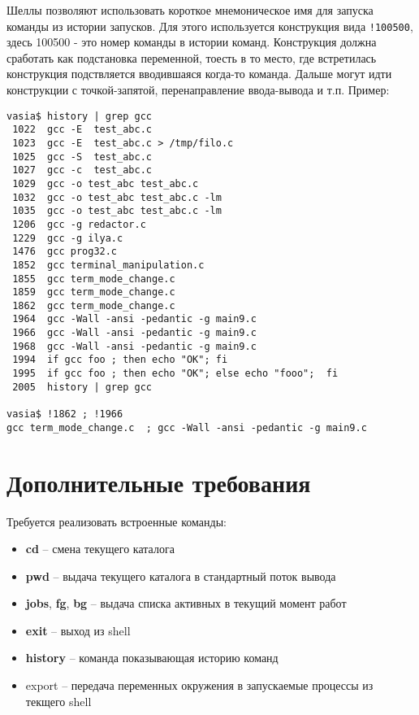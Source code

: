\documentclass[11pt, a4paper]{article}
\begin{document}
Шеллы позволяют использовать короткое мнемоническое имя для запуска команды из истории запусков.
Для этого используется конструкция вида \verb#!100500#, здесь 100500 - это номер команды в истории команд. 
Конструкция должна сработать как подстановка переменной, тоесть в то место, где встретилась конструкция подствляется 
вводившаяся когда-то команда. Дальше могут идти конструкции с точкой-запятой, перенаправление ввода-вывода
и т.п. Пример:
\begin{verbatim}
vasia$ history | grep gcc 
 1022  gcc -E  test_abc.c
 1023  gcc -E  test_abc.c > /tmp/filo.c
 1025  gcc -S  test_abc.c
 1027  gcc -c  test_abc.c
 1029  gcc -o test_abc test_abc.c
 1032  gcc -o test_abc test_abc.c -lm
 1035  gcc -o test_abc test_abc.c -lm
 1206  gcc -g redactor.c
 1229  gcc -g ilya.c 
 1476  gcc prog32.c 
 1852  gcc terminal_manipulation.c 
 1855  gcc term_mode_change.c 
 1859  gcc term_mode_change.c 
 1862  gcc term_mode_change.c 
 1964  gcc -Wall -ansi -pedantic -g main9.c 
 1966  gcc -Wall -ansi -pedantic -g main9.c 
 1968  gcc -Wall -ansi -pedantic -g main9.c 
 1994  if gcc foo ; then echo "OK"; fi
 1995  if gcc foo ; then echo "OK"; else echo "fooo";  fi
 2005  history | grep gcc

vasia$ !1862 ; !1966 
gcc term_mode_change.c  ; gcc -Wall -ansi -pedantic -g main9.c  
\end{verbatim}

\section{Дополнительные требования}

Требуется реализовать встроенные команды:
\begin{itemize}
\item  \textbf{cd} -- смена текущего каталога
\item  \textbf{pwd} -- выдача текущего каталога в стандартный поток вывода
\item  \textbf{jobs}, \textbf{fg}, \textbf{bg} -- выдача списка активных в текущий момент работ
\item  \textbf{exit} -- выход из shell
\item  \textbf{history} -- команда показывающая историю команд
\item export -- передача переменных окружения в запускаемые процессы из текщего shell
\end{itemize}
\end{document}
